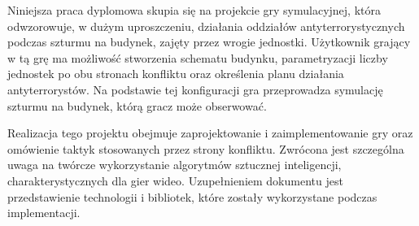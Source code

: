 Niniejsza praca dyplomowa skupia się na projekcie gry symulacyjnej, która odwzorowuje, w dużym uproszczeniu, działania oddziałów antyterrorystycznych podczas szturmu na budynek, zajęty przez wrogie jednostki. Użytkownik grający w tą grę ma możliwość stworzenia schematu budynku, parametryzacji liczby jednostek po obu stronach konfliktu oraz określenia planu działania antyterrorystów. Na podstawie tej konfiguracji gra przeprowadza symulację szturmu na budynek, którą gracz może obserwować.

Realizacja tego projektu obejmuje zaprojektowanie i zaimplementowanie gry oraz omówienie taktyk stosowanych przez strony konfliktu. Zwrócona jest szczególna uwaga na twórcze wykorzystanie algorytmów sztucznej inteligencji, charakterystycznych dla gier wideo. Uzupełnieniem dokumentu jest przedstawienie technologii i bibliotek, które zostały wykorzystane podczas implementacji.


